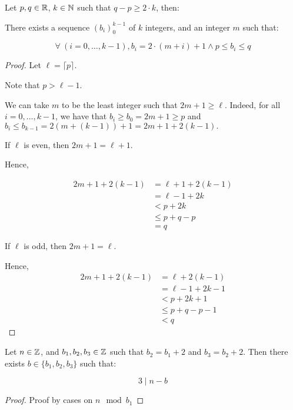 \begin{lemma}[blist]
    \label{lem:blist}
    \leanok
    Let $p,q\in\mathbb{R}$, $k\in\mathbb{N}$ such that $q - p \geq 2 \cdot k$, then:

    There exists a sequence $(b_i)_0^{k-1}$ of $k$ integers, and an integer $m$ such that:

    \[
        \forall\ (i = 0, \dots, k-1), b_i = 2 \cdot (m + i) + 1\land  p\leq b_i \leq q
    \]
\end{lemma}

\begin{proof}
    \leanok
    Let $\ell = \lceil p \rceil.$

    Note that $p > \ell - 1$.

    We can take $m$ to be the least integer such that $2m + 1 \geq \ell$. Indeed, for all $i = 0,\ldots,k-1$, we have that $b_i \geq b_0 = 2m + 1 \geq p$ and $b_i \leq b_{k-1} = 2(m+(k-1))+ 1 = 2m+1+2(k-1).$
    
    If $\ell$ is even, then $2m+1 = \ell + 1$.

    Hence, 
    
    \begin{align*}
        2m+1+2(k-1) &= \ell + 1 + 2(k-1) \\
        &= \ell - 1 + 2k \\
        &< p + 2k \\
        &\leq p + q - p \\
        &= q    
    \end{align*}

    If $\ell$ is odd, then $2m+1 = \ell$.
    
    Hence,
    \begin{align*}
        2m+1+2(k-1) &= \ell + 2(k-1)\\
        &= \ell - 1 + 2k - 1 \\
        &< p + 2k + 1 \\
        &\leq p + q - p - 1 \\
        &< q
    \end{align*}
\end{proof}

\begin{lemma}[res b]
    \label{lemma:res_b}
    \leanok
    Let $n\in\mathbb{Z}$, and $b_1,b_2,b_3\in\mathbb{Z}$ such that $b_2 = b_1 + 2$ and $b_3 = b_2 + 2$.
    Then there exists $b\in\{b_1,b_2,b_3\}$ such that:

    \[
        3 \mid n-b
    \]
\end{lemma}
\begin{proof}
    Proof by cases on $n \mod b_1$
\end{proof}


